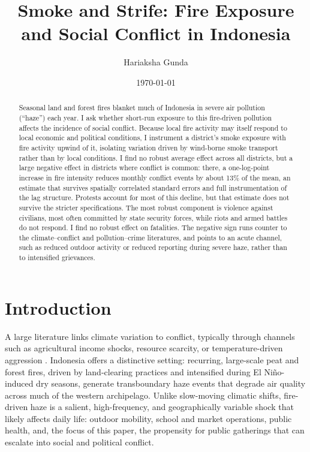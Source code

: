 \documentclass[12pt]{article}
\title{Smoke and Strife: Fire Exposure and Social Conflict in Indonesia}
\author{Hariaksha Gunda}
\affil{The University of Alabama}
\date{\today}
\begin{document}
\maketitle

\begin{abstract}
Seasonal land and forest fires blanket much of Indonesia in severe air pollution (``haze'') each year. I ask whether short-run exposure to this fire-driven pollution affects the incidence of social conflict. Because local fire activity may itself respond to local economic and political conditions, I instrument a district's smoke exposure with fire activity upwind of it, isolating variation driven by wind-borne smoke transport rather than by local conditions. I find no robust average effect across all districts, but a large negative effect in districts where conflict is common: there, a one-log-point increase in fire intensity reduces monthly conflict events by about 13\% of the mean, an estimate that survives spatially correlated standard errors and full instrumentation of the lag structure. Protests account for most of this decline, but that estimate does not survive the stricter specifications. The most robust component is violence against civilians, most often committed by state security forces, while riots and armed battles do not respond. I find no robust effect on fatalities. The negative sign runs counter to the climate--conflict and pollution--crime literatures, and points to an acute channel, such as reduced outdoor activity or reduced reporting during severe haze, rather than to intensified grievances.
\end{abstract}

\section{Introduction}

A large literature links climate variation to conflict, typically through channels such as agricultural income shocks, resource scarcity, or temperature-driven aggression \citep{hsiang2013quantifying}. Indonesia offers a distinctive setting: recurring, large-scale peat and forest fires, driven by land-clearing practices and intensified during El Ni\~{n}o-induced dry seasons, generate transboundary haze events that degrade air quality across much of the western archipelago. Unlike slow-moving climatic shifts, fire-driven haze is a salient, high-frequency, and geographically variable shock that likely affects daily life: outdoor mobility, school and market operations, public health, and, the focus of this paper, the propensity for public gatherings that can escalate into social and political conflict.
\end{document}
